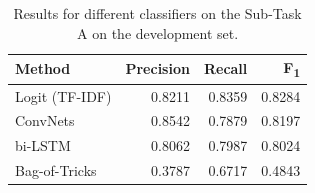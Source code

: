 \documentclass[11pt,a4paper]{article}
\begin{document}

\begin{table}[!h]
\begin{center}
\begin{tabular}{|l|r|r|r|}
\hline\centering\textbf{Method}  & \textbf{Precision} &  \textbf{Recall} &  \textbf{F\textsubscript{1}}\\
\hline
 Logit (TF-IDF) & 0.8211 & 0.8359 & 0.8284 \\
 ConvNets       & 0.8542 & 0.7879 & 0.8197 \\
 bi-LSTM        & 0.8062 & 0.7987 & 0.8024 \\
 Bag-of-Tricks  & 0.3787 & 0.6717 & 0.4843 \\
\hline
\end{tabular}
\end{center}
\caption{\label{devset-results} Results for different classifiers on the Sub-Task A on the development set.}
\end{table}
\end{document}
